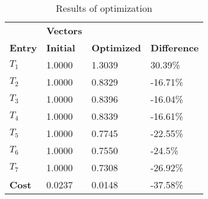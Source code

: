 \begin{table}[H]
\centering
\begin{tabular}{llll}
\textbf{}      & \cellcolor[HTML]{EFEFEF}\textbf{Vectors} & \textbf{} & \textbf{}         \\
\rowcolor[HTML]{EFEFEF} 
\textbf{Entry} & \textbf{Initial} & \textbf{Optimized} & \textbf{Difference} \\
$T_1$ & 1.0000 & 1.3039 & 30.39\% \\ 
$T_2$ & 1.0000 & 0.8329 & -16.71\% \\ 
$T_3$ & 1.0000 & 0.8396 & -16.04\% \\ 
$T_4$ & 1.0000 & 0.8339 & -16.61\% \\ 
$T_5$ & 1.0000 & 0.7745 & -22.55\% \\ 
$T_6$ & 1.0000 & 0.7550 & -24.5\% \\ 
$T_7$ & 1.0000 & 0.7308 & -26.92\% \\ 
\rowcolor[HTML]{EFEFEF} 
\textbf{Cost}  & 0.0237 & 0.0148 & -37.58\% \\ 
\end{tabular}
\caption{Results of optimization}
\label{tab:OptimizationAnalysis}
\end{table}